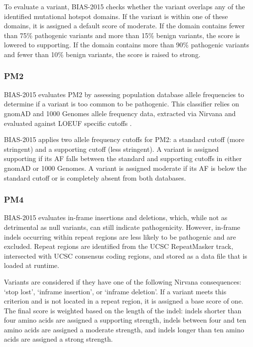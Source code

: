 \documentclass[unnumsec,webpdf,contemporary,large]{oup-authoring-template}
\theoremstyle{thmstyleone}
\theoremstyle{thmstyletwo}
\theoremstyle{thmstylethree}
\begin{document}
To evaluate a variant, BIAS-2015 checks whether the variant overlaps any of the identified mutational hotspot domains. If the variant is within one of these domains, it is assigned a default score of moderate. If the domain contains fewer than 75\% pathogenic variants and more than 15\% benign variants, the score is lowered to supporting. If the domain contains more than 90\% pathogenic variants and fewer than 10\% benign variants, the score is raised to strong.

\subsubsection{PM2}
BIAS-2015 evaluates PM2 by assessing population database allele frequencies to determine if a variant is too common to be pathogenic. This classifier relies on gnomAD and 1000 Genomes allele frequency data, extracted via Nirvana and evaluated against LOEUF specific cutoffs \cite{genomes2015global}.

BIAS-2015 applies two allele frequency cutoffs for PM2: a standard cutoff (more stringent) and a supporting cutoff (less stringent). A variant is assigned supporting if its AF falls between the standard and supporting cutoffs in either gnomAD or 1000 Genomes. A variant is assigned moderate if its AF is below the standard cutoff or is completely absent from both databases.

\subsubsection{PM4}
BIAS-2015 evaluates in-frame insertions and deletions, which, while not as detrimental as null variants, can still indicate pathogenicity. However, in-frame indels occurring within repeat regions are less likely to be pathogenic and are excluded. Repeat regions are identified from the UCSC RepeatMasker track, intersected with UCSC consensus coding regions, and stored as a data file that is loaded at runtime.\cite{kent2002blat,pruitt2014refseq,repeatmasker}

Variants are considered if they have one of the following Nirvana consequences: ‘stop lost’, ‘inframe insertion’, or ‘inframe deletion’. If a variant meets this criterion and is not located in a repeat region, it is assigned a base score of one. The final score is weighted based on the length of the indel: indels shorter than four amino acids are assigned a supporting strength, indels between four and ten amino acids are assigned a moderate strength, and indels longer than ten amino acids are assigned a strong strength.
\end{document}
